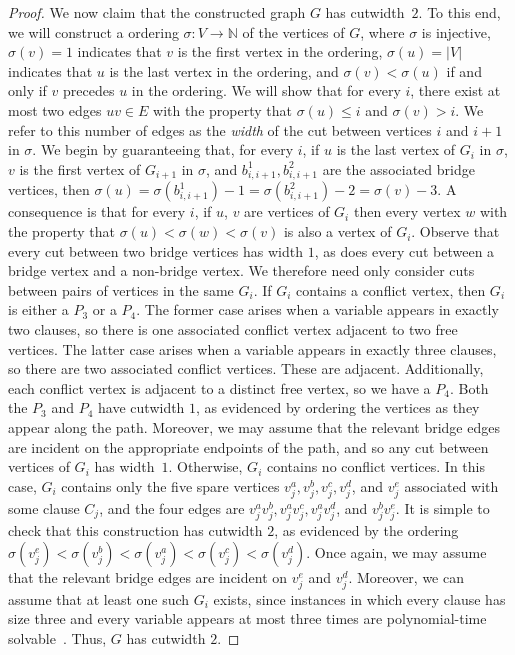 \begin{proof}
    We now claim that the constructed graph $G$ has cutwidth~$2$.
    To this end, we will construct a ordering $\sigma\colon V \rightarrow \mathbb{N}$ of the vertices of $G$, where $\sigma$ is injective, $\sigma(v) = 1$ indicates that $v$ is the first vertex in the ordering, $\sigma(u) = |V|$ indicates that $u$ is the last vertex in the ordering, and $\sigma(v) < \sigma(u)$ if and only if $v$ precedes $u$ in the ordering.
    We will show that for every $i$, there exist at most two edges $uv \in E$ with the property that $\sigma(u) \leq i$ and $\sigma(v) > i$. We refer to this number of edges as the \emph{width} of the cut between vertices $i$ and $i+1$ in $\sigma$.
    We begin by guaranteeing that, for every $i$, if $u$ is the last vertex of $G_i$ in $\sigma$, $v$ is the first vertex of $G_{i+1}$ in $\sigma$, and $b_{i, i+1}^1, b_{i, i+1}^2$ are the associated bridge vertices, then $\sigma(u) = \sigma(b_{i, i+1}^1) - 1 = \sigma(b_{i, i+1}^2) - 2 = \sigma(v) - 3$.
    A consequence is that for every $i$, if $u$, $v$ are vertices of $G_i$ then every vertex $w$ with the property that $\sigma(u) < \sigma(w) < \sigma(v)$ is also a vertex of $G_i$.
    Observe that every cut between two bridge vertices has width $1$, as does every cut between a bridge vertex and a non-bridge vertex.
    We therefore need only consider cuts between pairs of vertices in the same $G_i$.
    If $G_i$ contains a conflict vertex, then $G_i$ is either a $P_3$ or a $P_4$.
    The former case arises when a variable appears in exactly two clauses, so there is one associated conflict vertex adjacent to two free vertices.
    The latter case arises when a variable appears in exactly three clauses, so there are two associated conflict vertices.
    These are adjacent.
    Additionally, each conflict vertex is adjacent to a distinct free vertex, so we have a $P_4$.
    Both the $P_3$ and $P_4$ have cutwidth $1$, as evidenced by ordering the vertices as they appear along the path.
    Moreover, we may assume that the relevant bridge edges are incident on the appropriate endpoints of the path, and so any cut between vertices of $G_i$ has width~$1$.
    Otherwise, $G_i$ contains no conflict vertices.
    In this case, $G_i$ contains only the five spare vertices $v_j^a, v_j^b, v_j^c, v_j^d$, and $v_j^e$ associated with some clause $C_j$, and the four edges are $v_j^av_j^b, v_j^av_j^c, v_j^av_j^d$, and $v_j^bv_j^e$.
    It is simple to check that this construction has cutwidth $2$, as evidenced by the ordering $\sigma(v_j^e) < \sigma(v_j^b) < \sigma(v_j^a) < \sigma(v_j^c) < \sigma(v_j^d)$.
    Once again, we may assume that the relevant bridge edges are incident on $v_j^e$ and $v_j^d$.
    Moreover, we can assume that at least one such $G_i$ exists, since \boolSAT{} instances in which every clause has size three and every variable appears at most three times are polynomial-time solvable~\cite{tovey1984simplified}.
    Thus, $G$ has cutwidth $2$.


\end{proof}
